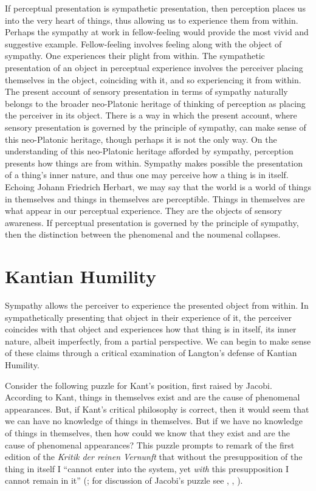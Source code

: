 If perceptual presentation is sympathetic presentation, then perception places us into the very heart of things, thus allowing us to experience them from within.  Perhaps the sympathy at work in fellow-feeling would provide the most vivid and suggestive example. Fellow-feeling involves feeling along with the object of sympathy. One experiences their plight from within. The sympathetic presentation of an object in perceptual experience involves the perceiver placing themselves in the object, coinciding with it, and so experiencing it from within. The present account of sensory presentation in terms of sympathy naturally belongs to the broader neo-Platonic heritage of thinking of perception as placing the perceiver in its object. There is a way in which the present account, where sensory presentation is governed by the principle of sympathy, can make sense of this neo-Platonic heritage, though perhaps it is not the only way. On the understanding of this neo-Platonic heritage afforded by sympathy, perception presents how things are from within. Sympathy makes possible the presentation of a thing's inner nature, and thus one may perceive how a thing is in itself. Echoing Johann Friedrich Herbart, we may say that the world is a world of things in themselves and things in themselves are perceptible. Things in themselves are what appear in our perceptual experience. They are the objects of sensory awareness. If perceptual presentation is governed by the principle of sympathy, then the distinction between the phenomenal and the noumenal collapses.



\section{Kantian Humility} %
\label{sec:kantian_humility}

Sympathy allows the perceiver to experience the presented object from within. In sympathetically presenting that object in their experience of it, the perceiver coincides with that object and experiences how that thing is in itself, its inner nature, albeit imperfectly, from a partial perspective. We can begin to make sense of these claims through a critical examination of Langton's \citeyearpar{Langton:1998aa} defense of Kantian Humility.

Consider the following puzzle for Kant's position, first raised by Jacobi. According to Kant, things in themselves exist and are the cause of phenomenal appearances. But, if Kant's critical philosophy is correct, then it would seem that we can have no knowledge of things in themselves. But if we have no knowledge of things in themselves, then how could we know that they exist and are the cause of phenomenal appearances? This puzzle prompts \citet[304]{Jacobi:1815bs} to remark of the first edition of the \emph{Kritik der reinen Vernunft} that without the presupposition of the thing in itself I ``cannot enter into the system, yet \emph{with} this presupposition I cannot remain in it'' (\citealt[335]{Guyer:1987xe}; for discussion of Jacobi's puzzle see \citealt[247--54]{Allison:1983ly}, \citealt[chapter 15]{Guyer:1987xe}, \citealt[chapter 1]{Langton:1998aa}).

